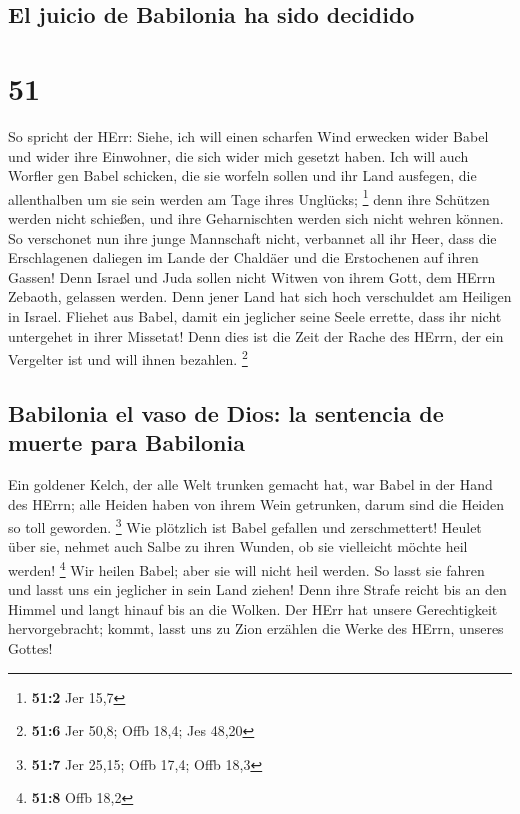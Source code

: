 \hypertarget{el-juicio-de-babilonia-ha-sido-decidido}{%
\subsection{El juicio de Babilonia ha sido
decidido}\label{el-juicio-de-babilonia-ha-sido-decidido}}

\hypertarget{section-50}{%
\section{51}\label{section-50}}

 So spricht der HErr: Siehe, ich will einen scharfen Wind
erwecken wider Babel und wider ihre Einwohner, die sich wider mich
gesetzt haben.  Ich will auch Worfler gen Babel schicken,
die sie worfeln sollen und ihr Land ausfegen, die allenthalben um sie
sein werden am Tage ihres Unglücks; \footnote{\textbf{51:2} Jer 15,7}
 denn ihre Schützen werden nicht schießen, und ihre
Geharnischten werden sich nicht wehren können. So verschonet nun ihre
junge Mannschaft nicht, verbannet all ihr Heer,  dass die
Erschlagenen daliegen im Lande der Chaldäer und die Erstochenen auf
ihren Gassen!  Denn Israel und Juda sollen nicht Witwen
von ihrem Gott, dem HErrn Zebaoth, gelassen werden. Denn jener Land hat
sich hoch verschuldet am Heiligen in Israel.  Fliehet aus
Babel, damit ein jeglicher seine Seele errette, dass ihr nicht
untergehet in ihrer Missetat! Denn dies ist die Zeit der Rache des
HErrn, der ein Vergelter ist und will ihnen bezahlen. \footnote{\textbf{51:6}
  Jer 50,8; Offb 18,4; Jes 48,20}

\hypertarget{babilonia-el-vaso-de-dios-la-sentencia-de-muerte-para-babilonia}{%
\subsection{Babilonia el vaso de Dios: la sentencia de muerte para
Babilonia}\label{babilonia-el-vaso-de-dios-la-sentencia-de-muerte-para-babilonia}}

 Ein goldener Kelch, der alle Welt trunken gemacht hat,
war Babel in der Hand des HErrn; alle Heiden haben von ihrem Wein
getrunken, darum sind die Heiden so toll geworden. \footnote{\textbf{51:7}
  Jer 25,15; Offb 17,4; Offb 18,3}  Wie plötzlich ist
Babel gefallen und zerschmettert! Heulet über sie, nehmet auch Salbe zu
ihren Wunden, ob sie vielleicht möchte heil werden! \footnote{\textbf{51:8}
  Offb 18,2}  Wir heilen Babel; aber sie will nicht heil
werden. So lasst sie fahren und lasst uns ein jeglicher in sein Land
ziehen! Denn ihre Strafe reicht bis an den Himmel und langt hinauf bis
an die Wolken.  Der HErr hat unsere Gerechtigkeit
hervorgebracht; kommt, lasst uns zu Zion erzählen die Werke des HErrn,
unseres Gottes!

